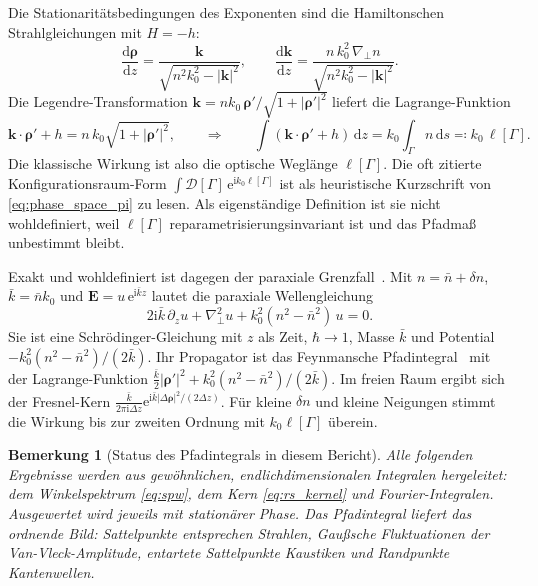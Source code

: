 \documentclass[11pt,a4paper]{scrartcl}
\theoremstyle{insightstyle}
\newtheorem{bemerkung}{Bemerkung}
\newcommand{\dd}{\mathrm{d}}
\newcommand{\ii}{\mathrm{i}}
\newcommand{\ee}{\mathrm{e}}
\newcommand{\grad}{\nabla_{\!\perp}}
\newcommand{\rh}{\bm{\rho}}
\begin{document}
Die Stationaritätsbedingungen des Exponenten sind die Hamiltonschen Strahlgleichungen mit $H=-h$:
\begin{equation}
    \frac{\dd\rh}{\dd z} = \frac{\bm k}{\sqrt{n^2k_0^2-|\bm k|^2}},\qquad
    \frac{\dd\bm k}{\dd z} = \frac{n\,k_0^2\,\grad n}{\sqrt{n^2k_0^2-|\bm k|^2}}.
\end{equation}
Die Legendre-Transformation $\bm k = nk_0\,\rh'/\sqrt{1+|\rh'|^2}$ liefert die Lagrange-Funktion
\begin{equation}
    \bm k\cdot\rh' + h = n\,k_0\sqrt{1+|\rh'|^2},
    \qquad\Longrightarrow\qquad
    \int(\bm k\cdot\rh'+h)\,\dd z = k_0\int_\Gamma n\,\dd s \eqqcolon k_0\,\ell[\Gamma].
    \label{eq:fermat_action}
\end{equation}
Die klassische Wirkung ist also die optische Weglänge $\ell[\Gamma]$. Die oft zitierte Konfigurationsraum-Form $\int\mathcal D[\Gamma]\,\ee^{\ii k_0\ell[\Gamma]}$ ist als heuristische Kurzschrift von \eqref{eq:phase_space_pi} zu lesen. Als eigenständige Definition ist sie nicht wohldefiniert, weil $\ell[\Gamma]$ reparametrisierungsinvariant ist und das Pfadmaß unbestimmt bleibt.

Exakt und wohldefiniert ist dagegen der paraxiale Grenzfall~\cite{gloge1969}. Mit $n=\bar n+\delta n$, $\bar k=\bar nk_0$ und $\bm E=u\,\ee^{\ii\bar kz}$ lautet die paraxiale Wellengleichung
\begin{equation}
    2\ii\bar k\,\partial_z u + \nabla_\perp^2u + k_0^2(n^2-\bar n^2)\,u = 0 .
\end{equation}
Sie ist eine Schrödinger-Gleichung mit $z$ als Zeit, $\hbar\to1$, Masse $\bar k$ und Potential $-k_0^2(n^2-\bar n^2)/(2\bar k)$. Ihr Propagator ist das Feynmansche Pfadintegral~\cite{feynman1965} mit der Lagrange-Funktion $\tfrac{\bar k}{2}|\rh'|^2 + k_0^2(n^2-\bar n^2)/(2\bar k)$. Im freien Raum ergibt sich der Fresnel-Kern $\frac{\bar k}{2\pi\ii\Delta z}\ee^{\ii\bar k|\Delta\rh|^2/(2\Delta z)}$. Für kleine $\delta n$ und kleine Neigungen stimmt die Wirkung bis zur zweiten Ordnung mit $k_0\ell[\Gamma]$ überein.

\begin{bemerkung}[Status des Pfadintegrals in diesem Bericht]
Alle folgenden Ergebnisse werden aus gewöhnlichen, endlichdimensionalen Integralen hergeleitet: dem Winkelspektrum \eqref{eq:spw}, dem Kern \eqref{eq:rs_kernel} und Fourier-Integralen. Ausgewertet wird jeweils mit stationärer Phase. Das Pfadintegral liefert das ordnende Bild: Sattelpunkte entsprechen Strahlen, Gaußsche Fluktuationen der Van-Vleck-Amplitude, entartete Sattelpunkte Kaustiken und Randpunkte Kantenwellen.
\end{bemerkung}
\end{document}
